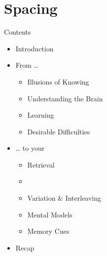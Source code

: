 \documentclass{ercisbeamer}
\begin{document}
\section{Spacing}
\begin{frame}{Contents}
    \begin{itemize}
        \item Introduction
        \item From …
        \begin{itemize}
            \item Illusions of Knowing
            \item Understanding the Brain
            \item Learning
            \item Desirable Difficulties
        \end{itemize}
        \item … to your 
        \begin{itemize}
            \item Retrieval
            \item {}
            \item Variation \& Interleaving
            \item Mental Models
            \item Memory Cues
        \end{itemize}
        \item Recap
    \end{itemize}
\end{frame}
\end{document}
